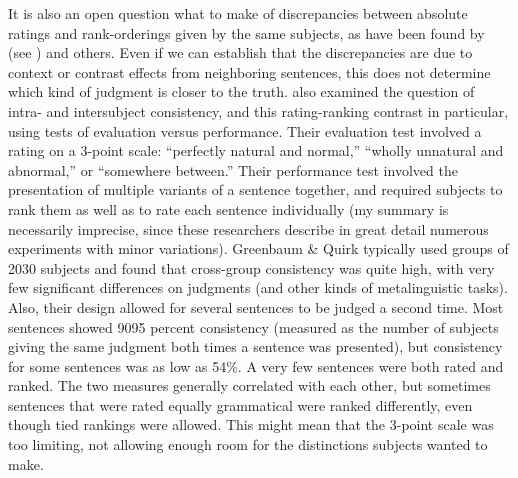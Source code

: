 It is also an open question what to make of discrepancies between absolute ratings and rank-orderings given by the same subjects, as have been found by \citet{SnowEtAl1977} (see )
and others. Even if we can establish that the discrepancies are due to context or contrast effects from neighboring sentences, this does not determine which kind of judgment is closer to the truth. \citet{GreenbaumEtAl1970} also examined the question of intra- and intersubject consistency, and this rating-ranking contrast in particular, using tests of evaluation versus performance. Their evaluation test involved a rating on a 3-point scale: ``perfectly natural and normal,'' ``wholly unnatural and abnormal,'' or ``somewhere between.'' Their performance test involved the presentation of multiple variants of a sentence together, and required subjects to rank them as well as to rate each sentence individually (my summary is necessarily imprecise, since these researchers describe in great detail numerous experiments with minor variations). Greenbaum \& Quirk typically used groups of 20\textendash{}30 subjects and found that cross-group consistency was quite high, with very few significant differences on judgments (and other kinds of metalinguistic tasks). Also, their design allowed for several sentences to be judged a second time. Most sentences showed 90\textendash{}95 percent consistency (measured as the number of subjects giving the same judgment both times a sentence was presented), but consistency for some sentences
was as low as 54\%. A very few sentences were both rated and ranked. The two measures generally correlated with each other, but sometimes sentences that were rated equally grammatical were ranked differently, even  though  tied  rankings were allowed. This might mean that the 3-point scale was too limiting, not allowing enough room for the distinctions subjects wanted to make.

